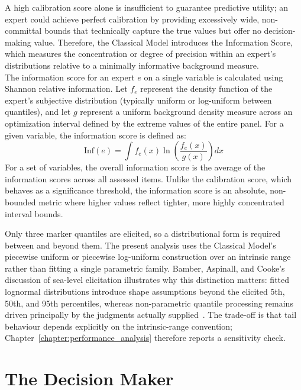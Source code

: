 A high calibration score alone is insufficient to guarantee predictive utility; an expert could achieve perfect calibration by providing excessively wide, non-committal bounds that technically capture the true values but offer no decision-making value. Therefore, the Classical Model introduces the Information Score, which measures the concentration or degree of precision within an expert's distributions relative to a minimally informative background measure.\\\newline
The information score for an expert $e$ on a single variable is calculated using Shannon relative information. Let $f_e$ represent the density function of the expert's subjective distribution (typically uniform or log-uniform between quantiles), and let $g$ represent a uniform background density measure across an optimization interval defined by the extreme values of the entire panel. For a given variable, the information score is defined as:
\[
\text{Inf}(e) = \int f_e(x) \ln\left(\frac{f_e(x)}{g(x)}\right) dx
\]
For a set of variables, the overall information score is the average of the information scores across all assessed items. Unlike the calibration score, which behaves as a significance threshold, the information score is an absolute, non-bounded metric where higher values reflect tighter, more highly concentrated interval bounds.

Only three marker quantiles are elicited, so a distributional form is required between and beyond them. The present analysis uses the Classical Model's piecewise uniform or piecewise log-uniform construction over an intrinsic range rather than fitting a single parametric family. Bamber, Aspinall, and Cooke's discussion of sea-level elicitation illustrates why this distinction matters: fitted lognormal distributions introduce shape assumptions beyond the elicited 5th, 50th, and 95th percentiles, whereas non-parametric quantile processing remains driven principally by the judgments actually supplied~\cite{bamberAspinallCooke2016}. The trade-off is that tail behaviour depends explicitly on the intrinsic-range convention; Chapter~\ref{chapter:performance_analysis} therefore reports a sensitivity check.

\section{The Decision Maker}
\label{sec:decision_maker}

